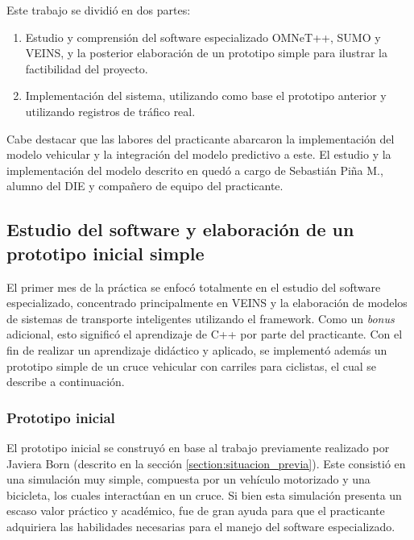 \documentclass[11pt,letterpaper]{article}
\begin{document}
Este trabajo se dividió en dos partes:

\begin{enumerate}
  \item Estudio y comprensión del software especializado OMNeT++, SUMO y VEINS, y la posterior elaboración de un prototipo simple para ilustrar la factibilidad del proyecto.
  \item Implementación del sistema, utilizando como base el prototipo anterior y utilizando registros de tráfico real.
\end{enumerate}

Cabe destacar que las labores del practicante abarcaron la implementación del modelo vehicular y la integración del modelo predictivo a este. El estudio y la implementación del modelo descrito en \cite{prediction-paper} quedó a cargo de Sebastián Piña M., alumno del DIE y compañero de equipo del practicante.

\subsection{Estudio del software y elaboración de un prototipo inicial simple}

El primer mes de la práctica se enfocó totalmente en el estudio del software especializado, concentrado principalmente en VEINS y la elaboración de modelos de sistemas de transporte inteligentes utilizando el framework. Como un \emph{bonus} adicional, esto significó el aprendizaje de C++ por parte del practicante. Con el fin de realizar un aprendizaje didáctico y aplicado, se implementó además un prototipo simple de un cruce vehicular con carriles para ciclistas, el cual se describe a continuación.

\subsubsection{Prototipo inicial}

El prototipo inicial se construyó en base al trabajo previamente realizado por Javiera Born (descrito en la sección \ref{section:situacion_previa}). Este consistió en una simulación muy simple, compuesta por un vehículo motorizado y una bicicleta, los cuales interactúan en un cruce. Si bien esta simulación presenta un escaso valor práctico y académico, fue de gran ayuda para que el practicante adquiriera las habilidades necesarias para el manejo del software especializado.
\end{document}
